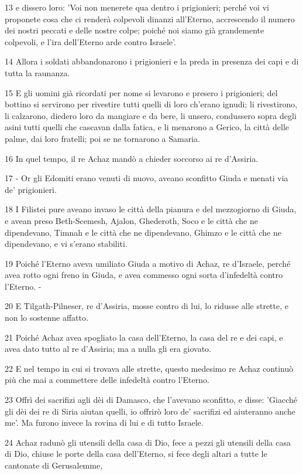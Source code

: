 \par 13 e dissero loro: 'Voi non menerete qua dentro i prigionieri; perché voi vi proponete cosa che ci renderà colpevoli dinanzi all'Eterno, accrescendo il numero dei nostri peccati e delle nostre colpe; poiché noi siamo già grandemente colpevoli, e l'ira dell'Eterno arde contro Israele'.
\par 14 Allora i soldati abbandonarono i prigionieri e la preda in presenza dei capi e di tutta la raunanza.
\par 15 E gli uomini già ricordati per nome si levarono e presero i prigionieri; del bottino si servirono per rivestire tutti quelli di loro ch'erano ignudi; li rivestirono, li calzarono, diedero loro da mangiare e da bere, li unsero, condussero sopra degli asini tutti quelli che cascavan dalla fatica, e li menarono a Gerico, la città delle palme, dai loro fratelli; poi se ne tornarono a Samaria.
\par 16 In quel tempo, il re Achaz mandò a chieder soccorso ai re d'Assiria.
\par 17 - Or gli Edomiti erano venuti di nuovo, aveano sconfitto Giuda e menati via de' prigionieri.
\par 18 I Filistei pure aveano invaso le città della pianura e del mezzogiorno di Giuda, e avean preso Beth-Scemesh, Ajalon, Ghederoth, Soco e le città che ne dipendevano, Timnah e le città che ne dipendevano, Ghimzo e le città che ne dipendevano, e vi s'erano stabiliti.
\par 19 Poiché l'Eterno aveva umiliato Giuda a motivo di Achaz, re d'Israele, perché avea rotto ogni freno in Giuda, e avea commesso ogni sorta d'infedeltà contro l'Eterno. -
\par 20 E Tilgath-Pilneser, re d'Assiria, mosse contro di lui, lo ridusse alle strette, e non lo sostenne affatto.
\par 21 Poiché Achaz avea spogliato la casa dell'Eterno, la casa del re e dei capi, e avea dato tutto al re d'Assiria; ma a nulla gli era giovato.
\par 22 E nel tempo in cui si trovava alle strette, questo medesimo re Achaz continuò più che mai a commettere delle infedeltà contro l'Eterno.
\par 23 Offrì dei sacrifizi agli dèi di Damasco, che l'avevano sconfitto, e disse: 'Giacché gli dèi dei re di Siria aiutan quelli, io offrirò loro de' sacrifizi ed aiuteranno anche me'. Ma furono invece la rovina di lui e di tutto Israele.
\par 24 Achaz radunò gli utensili della casa di Dio, fece a pezzi gli utensili della casa di Dio, chiuse le porte della casa dell'Eterno, si fece degli altari a tutte le cantonate di Gerusalemme,
